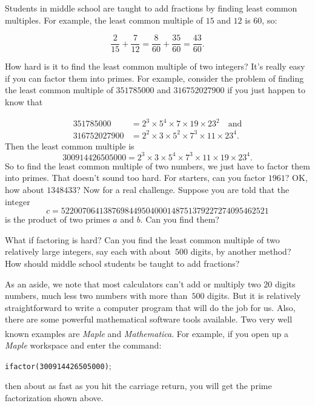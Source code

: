 \begin{example}
Students in middle school are taught to add fractions by finding
least common multiples.  For example, the least common multiple
of $15$ and $12$ is $60$, so:

\[
\frac{2}{15}+ \frac{7}{12} = \frac{8}{60}+\frac{35}{60} = \frac{43}{60}.
\]

How hard is it to find the least common multiple of two integers?
It's really easy if you can factor them into primes.  For example,
consider the problem of finding the least common multiple
of $351785000$ and  $316752027900$ if you just happen to know that

\begin{align*}
 351785000 &=  2^3\times 5^4\times 7\times19\times 23^2\quad\text{and}\\ 
 316752027900 &=  2^2\times3\times 5^2\times 7^3\times 11\times 23^4. 
\end{align*}
Then the least common multiple is
\[300914426505000 =  2^3\times3\times 5^4\times 7^3\times 11\times 19\times 23^4.\]
So to find the least common multiple of two numbers, we just have
to factor them into primes.  That doesn't sound too hard. For starters, can you
factor $1961$?  OK, how about $1348433$?  Now for a real challenge.
Suppose you are told that the integer
\[
c = 5220070641387698449504000148751379227274095462521
\]
is the product of two primes $a$ and $b$.  Can you find them?

What if factoring is hard?  Can you find the least common multiple of
two relatively large integers, say each with about~$500$ digits, by
another method? How should middle school students be taught to add
fractions?

As an aside, we note that most calculators can't add or multiply two
$20$ digits numbers, much less two numbers with more than~$500$
digits.  But it is relatively straightforward to write a computer
program that will do the job for us.  Also, there are some powerful
mathematical software tools available.  Two very well known examples
are \emph{Maple}\textsuperscript{\tiny\textregistered} and
\emph{Mathematica}\textsuperscript{\tiny\textregistered}.  For example, if you open up a
\emph{Maple} workspace and enter the command:

\begin{center}
\texttt{ifactor(300914426505000)};
\end{center}
then about as fast as you hit the carriage return, you
will get the prime factorization shown above.


\end{example}
